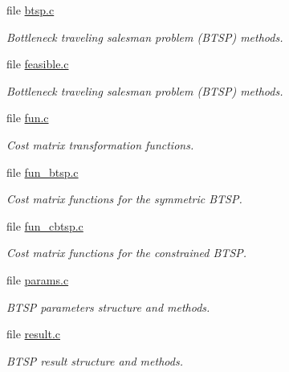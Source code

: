 \begin{CompactItemize}
\item 
file \hyperlink{lib_2btsp_2btsp_8c}{btsp.c}
\begin{CompactList}\small\item\em Bottleneck traveling salesman problem (BTSP) methods. \item\end{CompactList}

\item 
file \hyperlink{feasible_8c}{feasible.c}
\begin{CompactList}\small\item\em Bottleneck traveling salesman problem (BTSP) methods. \item\end{CompactList}

\item 
file \hyperlink{fun_8c}{fun.c}
\begin{CompactList}\small\item\em Cost matrix transformation functions. \item\end{CompactList}

\item 
file \hyperlink{fun__btsp_8c}{fun\_\-btsp.c}
\begin{CompactList}\small\item\em Cost matrix functions for the symmetric BTSP. \item\end{CompactList}

\item 
file \hyperlink{fun__cbtsp_8c}{fun\_\-cbtsp.c}
\begin{CompactList}\small\item\em Cost matrix functions for the constrained BTSP. \item\end{CompactList}

\item 
file \hyperlink{btsp_2params_8c}{params.c}
\begin{CompactList}\small\item\em BTSP parameters structure and methods. \item\end{CompactList}

\item 
file \hyperlink{btsp_2result_8c}{result.c}
\begin{CompactList}\small\item\em BTSP result structure and methods. \item\end{CompactList}


\end{CompactItemize}
